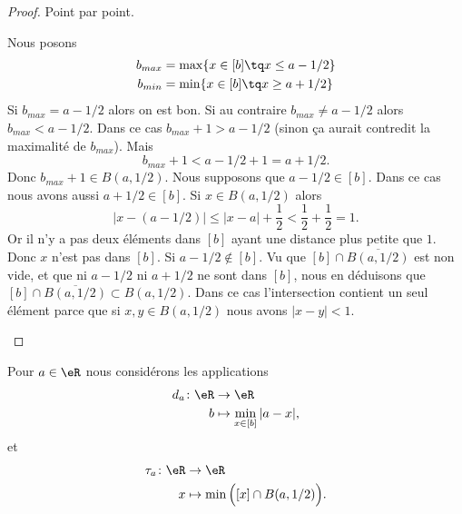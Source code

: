 \begin{proof}
	Point par point.
	\begin{subproof}
		Nous posons
		\begin{subequations}
			\begin{align}
				b_{max} & =\max\{ x\in[b]\tq x\leq a-1/2 \} \\
				b_{min} & =\min\{ x\in[b]\tq x\geq a+1/2 \}
			\end{align}
		\end{subequations}
		Si \( b_{max}=a-1/2\) alors on est bon. Si au contraire \( b_{max}\neq a-1/2\) alors \( b_{max}<a-1/2\). Dans ce cas \( b_{max}+1>a-1/2\) (sinon ça aurait contredit la maximalité de \( b_{max}\)). Mais
		\begin{equation}
			b_{max}+1<a-1/2+1=a+1/2.
		\end{equation}
		Donc \( b_{max}+1\in B(a,1/2)\).
		Nous supposons que \( a-1/2\in[b]\). Dans ce cas nous avons aussi \( a+1/2\in[b]\). Si \( x\in B(a,1/2)\) alors
		\begin{equation}
			| x-(a-1/2) |\leq | x-a |+\frac{ 1 }{2}<\frac{ 1 }{2}+\frac{ 1 }{2}=1.
		\end{equation}
		Or il n'y a pas deux éléments dans \( [b]\) ayant une distance plus petite que \( 1\). Donc \( x\) n'est pas dans \( [b]\).
		Si \( a-1/2\not\in [b]\). Vu que \( [b]\cap \overline{B(a,1/2)}\) est non vide, et que ni \( a-1/2\) ni \( a+1/2\) ne sont dans \( [b]\), nous en déduisons que \( [b]\cap \overline{B(a,1/2)}\subset B(a,1/2) \). Dans ce cas l'intersection contient un seul élément parce que si \( x,y\in B(a,1/2)\) nous avons \( | x-y |<1\).
	\end{subproof}
\end{proof}

Pour \( a\in \eR\) nous considérons les applications
\begin{equation}
	\begin{aligned}
		d_a\colon \eR & \to \eR                         \\
		b             & \mapsto \min_{x\in [b]}| a-x |,
	\end{aligned}
\end{equation}
et
\begin{equation}
	\begin{aligned}
		\tau_a\colon \eR & \to \eR                                    \\
		x                & \mapsto \min \Big( [x]\cap B(a,1/2) \Big).
	\end{aligned}
\end{equation}


